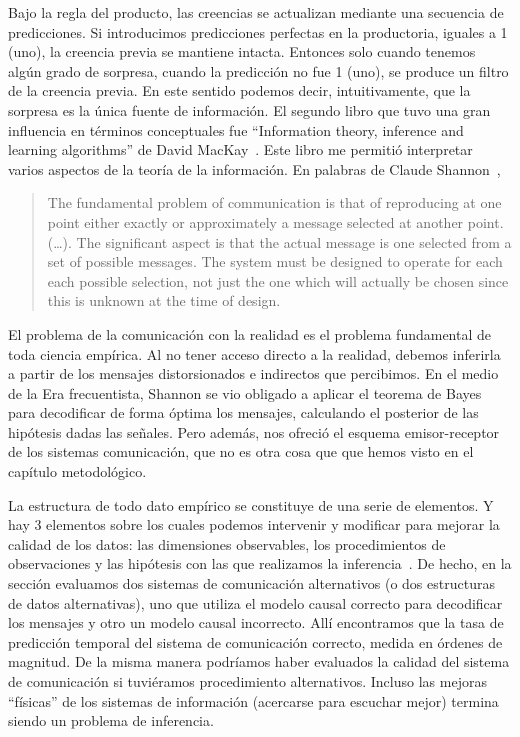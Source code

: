 \documentclass[a4paper,11pt]{book}
\theoremstyle{definition}
\begin{document}
Bajo la regla del producto, las creencias se actualizan mediante una secuencia de predicciones.
%
Si introducimos predicciones perfectas en la productoria, iguales a 1 (uno), la creencia previa se mantiene intacta.
%
Entonces solo cuando tenemos alg\'un grado de sorpresa, cuando la predicci\'on no fue 1 (uno), se produce un filtro de la creencia previa.
%
En este sentido podemos decir, intuitivamente, que la sorpresa es la \'unica fuente de informaci\'on.
%
El segundo libro que tuvo una gran influencia en t\'erminos conceptuales fue ``Information theory, inference and learning algorithms'' de David MacKay~\cite{mackay2003-informationInferenceLearning}.
%
Este libro me permiti\'o interpretar varios aspectos de la teor\'ia de la informaci\'on.
%
En palabras de Claude Shannon~\cite{shannon1948-theoryOfCommunication},
%
\begin{quotation}
The fundamental problem of communication is that of reproducing at one point either exactly or approximately a message selected at another point.
(\dots).
The significant aspect is that the actual message is one selected from a set of possible messages.
The system must be designed to operate for each each possible selection, not just the one which will actually be chosen since this is unknown at the time of design.
\end{quotation}
%
El problema de la comunicaci\'on con la realidad es el problema fundamental de toda ciencia emp\'irica.
%
Al no tener acceso directo a la realidad, debemos inferirla a partir de los mensajes distorsionados e indirectos que percibimos.
%
En el medio de la Era frecuentista, Shannon se vio obligado a aplicar el teorema de Bayes para decodificar de forma \'optima los mensajes, calculando el posterior de las hip\'otesis dadas las se\~nales.
%
Pero adem\'as, nos ofreci\'o el esquema emisor-receptor de los sistemas comunicaci\'on, que no es otra cosa que \emph{} que hemos visto en el cap\'itulo metodol\'ogico.


La estructura de todo dato emp\'irico se constituye de una serie de elementos.
%
Y hay 3 elementos sobre los cuales podemos intervenir y modificar para mejorar la calidad de los datos: las dimensiones observables, los procedimientos de observaciones y las hip\'otesis con las que realizamos la inferencia~\cite{Samaja1999}.
%
De hecho, en la secci\'on \emph{} evaluamos dos sistemas de comunicaci\'on alternativos (o dos estructuras de datos alternativas), uno que utiliza el modelo causal correcto para decodificar los mensajes y otro un modelo causal incorrecto.
%
All\'i encontramos que la tasa de predicci\'on temporal del sistema de comunicaci\'on correcto, medida en \'ordenes de magnitud.
%
De la misma manera podr\'iamos haber evaluados la calidad del sistema de comunicaci\'on si tuvi\'eramos procedimiento alternativos.
%
Incluso las mejoras ``f\'isicas'' de los sistemas de informaci\'on (acercarse para escuchar mejor) termina siendo un problema de inferencia.
\end{document}
